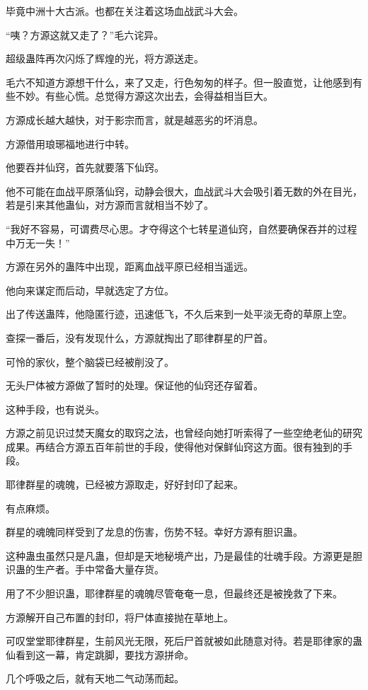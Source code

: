 \begin{this_body}
毕竟中洲十大古派。也都在关注着这场血战武斗大会。

“咦？方源这就又走了？”毛六诧异。

超级蛊阵再次闪烁了辉煌的光，将方源送走。

毛六不知道方源想干什么，来了又走，行色匆匆的样子。但一股直觉，让他感到有些不妙。有些心慌。总觉得方源这次出去，会得益相当巨大。

方源成长越大越快，对于影宗而言，就是越恶劣的坏消息。

方源借用琅琊福地进行中转。

他要吞并仙窍，首先就要落下仙窍。

他不可能在血战平原落仙窍，动静会很大，血战武斗大会吸引着无数的外在目光，若是引来其他蛊仙，对方源而言就相当不妙了。

“我好不容易，可谓费尽心思。才夺得这个七转星道仙窍，自然要确保吞并的过程中万无一失！”

方源在另外的蛊阵中出现，距离血战平原已经相当遥远。

他向来谋定而后动，早就选定了方位。

出了传送蛊阵，他隐匿行迹，迅速低飞，不久后来到一处平淡无奇的草原上空。

查探一番后，没有发现什么，方源就掏出了耶律群星的尸首。

可怜的家伙，整个脑袋已经被削没了。

无头尸体被方源做了暂时的处理。保证他的仙窍还存留着。

这种手段，也有说头。

方源之前见识过焚天魔女的取窍之法，也曾经向她打听索得了一些空绝老仙的研究成果。再结合方源五百年前世的手段，使得他对保鲜仙窍这方面。很有独到的手段。

耶律群星的魂魄，已经被方源取走，好好封印了起来。

有点麻烦。

群星的魂魄同样受到了龙息的伤害，伤势不轻。幸好方源有胆识蛊。

这种蛊虫虽然只是凡蛊，但却是天地秘境产出，乃是最佳的壮魂手段。方源更是胆识蛊的生产者。手中常备大量存货。

用了不少胆识蛊，耶律群星的魂魄尽管奄奄一息，但最终还是被挽救了下来。

方源解开自己布置的封印，将尸体直接抛在草地上。

可叹堂堂耶律群星，生前风光无限，死后尸首就被如此随意对待。若是耶律家的蛊仙看到这一幕，肯定跳脚，要找方源拼命。

几个呼吸之后，就有天地二气动荡而起。


\end{this_body}
